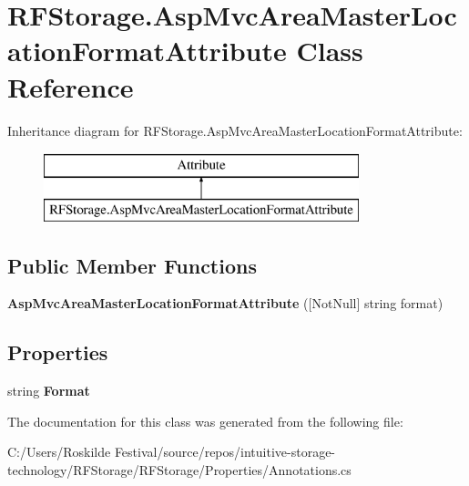 \hypertarget{class_r_f_storage_1_1_asp_mvc_area_master_location_format_attribute}{}\section{R\+F\+Storage.\+Asp\+Mvc\+Area\+Master\+Location\+Format\+Attribute Class Reference}
\label{class_r_f_storage_1_1_asp_mvc_area_master_location_format_attribute}
Inheritance diagram for R\+F\+Storage.\+Asp\+Mvc\+Area\+Master\+Location\+Format\+Attribute\+:\begin{figure}[H]
\begin{center}
\leavevmode
\includegraphics[height=2.000000cm]{class_r_f_storage_1_1_asp_mvc_area_master_location_format_attribute}
\end{center}
\end{figure}
\subsection*{Public Member Functions}
\begin{DoxyCompactItemize}
\item 
\mbox{\label{class_r_f_storage_1_1_asp_mvc_area_master_location_format_attribute_a742ef10ebbbe02b294b07c5ddc4c100b}} 
{\bfseries Asp\+Mvc\+Area\+Master\+Location\+Format\+Attribute} (\mbox{[}Not\+Null\mbox{]} string format)
\end{DoxyCompactItemize}
\subsection*{Properties}
\begin{DoxyCompactItemize}
\item 
\mbox{\label{class_r_f_storage_1_1_asp_mvc_area_master_location_format_attribute_aa73f868f6e2ed0e315dc153d70a597f7}} 
string {\bfseries Format}
\end{DoxyCompactItemize}


The documentation for this class was generated from the following file\+:\begin{DoxyCompactItemize}
\item 
C\+:/\+Users/\+Roskilde Festival/source/repos/intuitive-\/storage-\/technology/\+R\+F\+Storage/\+R\+F\+Storage/\+Properties/Annotations.\+cs\end{DoxyCompactItemize}
